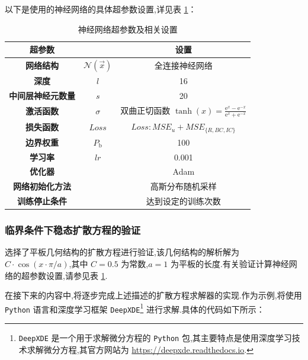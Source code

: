 \documentclass{Sichuan Normal University}
\begin{document}
以下是使用的神经网络的具体超参数设置,详见表 \ref{tab:hyperparameter_settings}：
\begin{table}[H]
    \caption{神经网络超参数及相关设置}
    \centering
    \begin{tabular}{ccc}
        \toprule
        \textbf{超参数} && \textbf{设置} \\
        \midrule
        \textbf{网络结构} &$\mathcal{N}(\vec{x})$& 全连接神经网络 \\
        \textbf{深度} &$l$& 16 \\
        \textbf{中间层神经元数量}  &$s$& 20 \\
        \textbf{激活函数} &$\sigma$& 双曲正切函数  $\tanh(x)=\frac{\mathrm{e}^x-\mathrm{e}^{-x}}{\mathrm{e}^x+\mathrm{e}^{-x}}$ \\
        \textbf{损失函数} &$Loss$& $Loss: M S E_u+M S E_{\{R, B C, I C\}}$ \\
        \textbf{边界权重}  &$P_{\mathrm{b}}$& 100 \\
        \textbf{学习率} &$lr$& 0.001  \\
        \textbf{优化器} && Adam  \\
        \textbf{网络初始化方法} && 高斯分布随机采样 \\
        \textbf{训练停止条件} && 达到设定的训练次数\\
        \bottomrule
    \end{tabular}
    \label{tab:hyperparameter_settings}
\end{table}
\subsubsection{临界条件下稳态扩散方程的验证}

选择了平板几何结构的扩散方程进行验证,该几何结构的解析解为$C\cdot\cos(x\cdot\pi/a)$,其中 $C=0.5$ 为常数,$a=1$ 为平板的长度.有关验证计算神经网络的超参数设置,请参见表 \ref{tab:hyperparameter_settings}.

在接下来的内容中,将逐步完成上述描述的扩散方程求解器的实现.作为示例,将使用 \texttt{Python} 语言和深度学习框架 \texttt{DeepXDE}\footnote{\texttt{DeepXDE} \cite{luDeepXDEDeepLearning2021}是一个用于求解微分方程的 \texttt{Python} 包,其主要特点是使用深度学习技术求解微分方程,其官方网站为 \url{https://deepxde.readthedocs.io}.} 进行求解.具体的代码如下所示：
\end{document}
